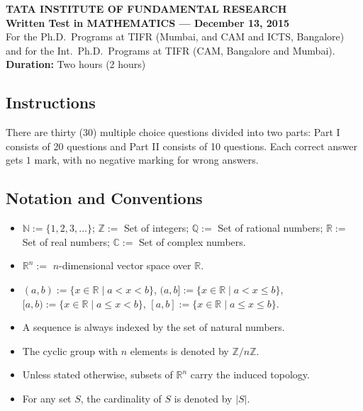 \documentclass[11pt, a4paper]{article}
\begin{document}
\begin{center}
  \textbf{TATA INSTITUTE OF FUNDAMENTAL RESEARCH}\\
  \textbf{Written Test in MATHEMATICS --- December 13, 2015}\\
  For the Ph.D.\ Programs at TIFR (Mumbai, and CAM and ICTS, Bangalore) and for the Int.\ Ph.D.\ Programs at TIFR (CAM, Bangalore and Mumbai).\\
  \textbf{Duration:} Two hours (2 hours)
\end{center}

\subsection*{Instructions}
There are thirty (30) multiple choice questions divided into two parts: Part I consists of 20 questions and Part II consists of 10 questions. Each correct answer gets $1$ mark, with no negative marking for wrong answers.

\subsection*{Notation and Conventions}
\begin{itemize}
  \item $\mathbb{N} := \{1, 2, 3, \dots\}$; $\mathbb{Z} :=$ Set of integers; $\mathbb{Q} :=$ Set of rational numbers; $\mathbb{R} :=$ Set of real numbers; $\mathbb{C} :=$ Set of complex numbers.
  \item $\mathbb{R}^n :=$ $n$-dimensional vector space over $\mathbb{R}$.
  \item $(a, b) := \{x \in \mathbb{R} \mid a < x < b\}$, $(a, b] := \{x \in \mathbb{R} \mid a < x \le b\}$, $[a, b) := \{x \in \mathbb{R} \mid a \le x < b\}$, $[a, b] := \{x \in \mathbb{R} \mid a \le x \le b\}$.
  \item A sequence is always indexed by the set of natural numbers.
  \item The cyclic group with $n$ elements is denoted by $\mathbb{Z}/n\mathbb{Z}$.
  \item Unless stated otherwise, subsets of $\mathbb{R}^n$ carry the induced topology.
  \item For any set $S$, the cardinality of $S$ is denoted by $|S|$.
\end{itemize}
\end{document}

